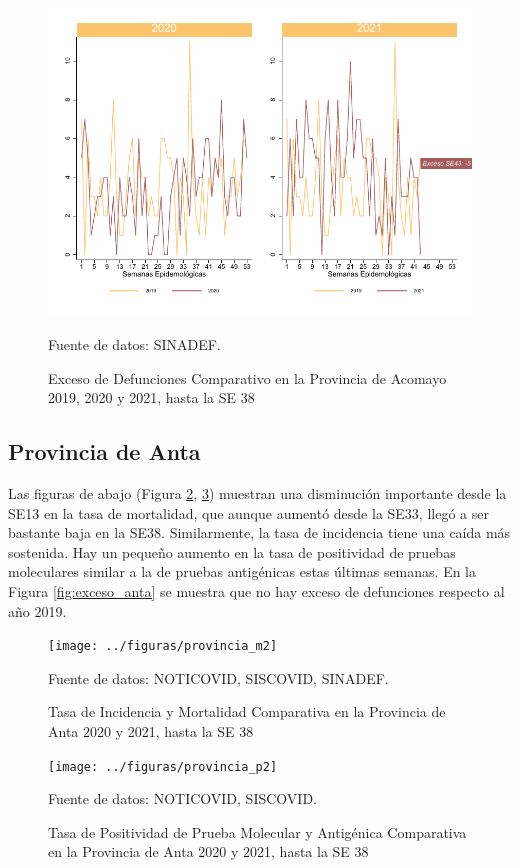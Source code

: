 \documentclass[12pt,a4paper,openany]{book}
\begin{document}
	\begin{figure}[h]
	\caption{Exceso de Defunciones Comparativo en la Provincia de Acomayo 2019, 2020 y 2021, hasta la SE 38}\label{fig:exceso_acomayo}
	\begin{center}
		\includegraphics[width=0.7\linewidth]{../figuras/exceso_1}
	\end{center}
	{\footnotesize {Fuente de datos: SINADEF.}}
	\end{figure}

	\clearpage
	
	\subsection*{Provincia de Anta}
	\noindent Las figuras de abajo (Figura \ref{fig:inc_mort_anta}, \ref{fig:positividad_anta})  muestran una disminución importante desde la SE13 en la tasa de mortalidad, que aunque aumentó desde la SE33, llegó a ser bastante baja en la SE38. Similarmente, la tasa de incidencia tiene una caída más sostenida. Hay un pequeño aumento en la tasa de positividad de pruebas moleculares similar a la de pruebas antigénicas estas últimas semanas. En la Figura \ref{fig:exceso_anta} se muestra que no hay exceso de defunciones respecto al año 2019.
	
		\begin{figure}[h]
		\caption{Tasa de Incidencia y Mortalidad Comparativa en la Provincia de Anta 2020 y 2021, hasta la SE 38}\label{fig:inc_mort_anta}
		\begin{center}
			\texttt{[image: ../figuras/provincia\_m2]}
		\end{center}
		{\footnotesize {Fuente de datos: NOTICOVID, SISCOVID, SINADEF.}}
	\end{figure}
	
	\begin{figure}[h]
		\caption{Tasa de Positividad de Prueba Molecular y Antigénica Comparativa en la Provincia de Anta 2020 y 2021, hasta la SE 38}\label{fig:positividad_anta}
		\begin{center}
			\texttt{[image: ../figuras/provincia\_p2]}
		\end{center}
		{\footnotesize {Fuente de datos: NOTICOVID, SISCOVID.}}
	\end{figure}
	
\end{document}
